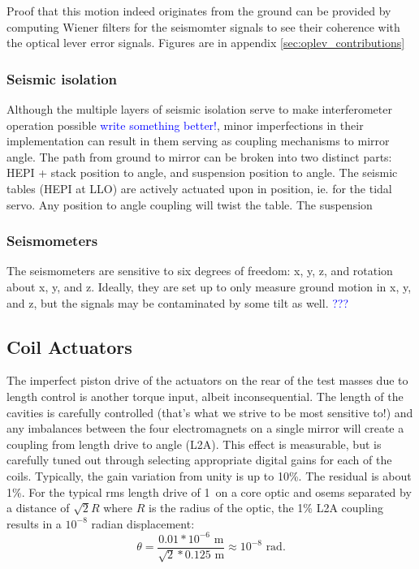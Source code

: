 
Proof that this motion indeed originates from the ground can be provided by computing Wiener filters for the seismomter signals to see their coherence with the optical lever error signals. Figures are in appendix \ref{sec:oplev_contributions}





\subsubsection{Seismic isolation}
Although the multiple layers of seismic isolation serve to make interferometer operation possible \textcolor{blue}{write something better!}, minor imperfections in their implementation can result in them serving as coupling mechanisms to mirror angle. The path from ground to mirror can be broken into two distinct parts: HEPI + stack position to angle, and suspension position to angle. The seismic tables (HEPI at LLO) are actively actuated upon in position, ie. for the tidal servo. Any position to angle coupling will twist the table. The suspension 


\subsubsection{Seismometers}
The seismometers are sensitive to six degrees of freedom: x, y, z, and rotation about x, y, and z. Ideally, they are set up to only measure ground motion in x, y, and z, but the signals may be contaminated by some tilt as well. \textcolor{blue}{???}




\subsection{Coil Actuators} 
\label{sec:L2A}
The imperfect piston drive of the actuators on the rear of the test masses due to length control is another torque input, albeit inconsequential. The length of the cavities is carefully controlled (that's what we strive to be most sensitive to!) and any imbalances between the four electromagnets on a single mirror will create a coupling from length drive to angle (L2A). This effect is measurable, but is carefully tuned out through selecting appropriate digital gains for each of the coils. Typically, the gain variation from unity is up to 10\%. The residual is about 1\%. For the typical rms length drive of 1~\micron on a core optic and osems separated by a distance of $\sqrt{2} R$ where $R$ is the radius of the optic, the 1\% L2A coupling results in a $10^{-8}$ radian displacement:
\begin{equation}
\theta = \frac{0.01 * 10^{-6} \mbox{ m}}{\sqrt{2} * 0.125 \mbox{ m}} \approx 10^{-8} \mbox{ rad}.
\end{equation}

